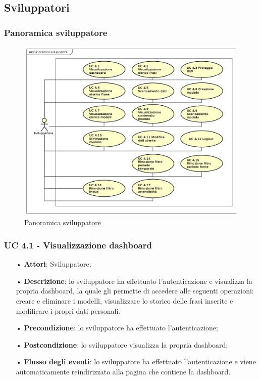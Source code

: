 \subsection{Sviluppatori}
\subsubsection{Panoramica sviluppatore}
\begin{figure}[H]
	\centering
	\includegraphics[width=17cm, keepaspectratio]{img/UC4x.png} 
	\caption{Panoramica sviluppatore}\label{fig:4x}
\end{figure}
\subsubsection{UC 4.1 - Visualizzazione dashboard}
\begin{itemize}
	\item[•]\textbf{Attori}: Sviluppatore;
	\item[•]\textbf{Descrizione}: lo sviluppatore ha effettuato l'autenticazione e visualizza la propria dashboard, la quale gli permette di accedere alle seguenti operazioni: creare e eliminare i modelli, visualizzare lo storico delle frasi inserite e modificare i propri dati personali.
	\item[•]\textbf{Precondizione}: lo sviluppatore ha effettuato l'autenticazione;
	\item[•]\textbf{Postcondizione}: lo sviluppatore visualizza la propria dashboard; 
	\item[•]\textbf{Flusso degli eventi}: lo sviluppatore ha effettuato l'autenticazione e viene automaticamente reindirizzato alla pagina che contiene la dashboard.
\end{itemize}

